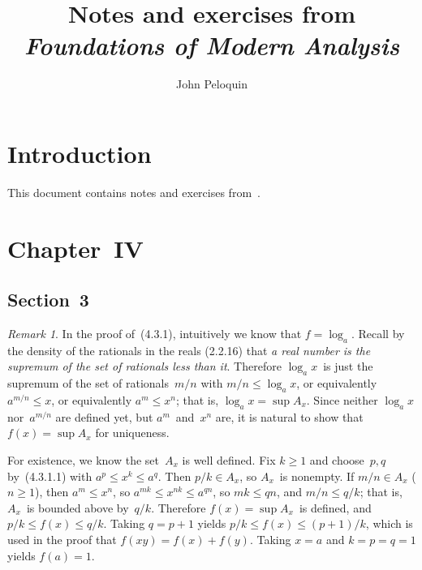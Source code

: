 \documentclass[letterpaper,12pt]{article}
\title{Notes and exercises from\\\textit{Foundations of Modern Analysis}}
\author{John Peloquin}
\date{}
\theoremstyle{plain}
\theoremstyle{definition}
\theoremstyle{remark}
\newtheorem*{rmk}{Remark}
\begin{document}
\maketitle

\section*{Introduction}
This document contains notes and exercises from~\cite{dieudonne}.

\section*{Chapter~IV}
\subsection*{Section~3}
\begin{rmk}
In the proof of~(4.3.1), intuitively we know that \(f=\log_a\). Recall by the density of the rationals in the reals (2.2.16) that \emph{a real number is the supremum of the set of rationals less than it}. Therefore \(\log_a x\)~is just the supremum of the set of rationals~\(m/n\) with \(m/n\le\log_a x\), or equivalently \(a^{m/n}\le x\), or equivalently \(a^m\le x^n\); that is, \(\log_a x=\sup A_x\). Since neither \(\log_a x\) nor~\(a^{m/n}\) are defined yet, but \(a^m\)~and~\(x^n\) are, it is natural to show that \(f(x)=\sup A_x\) for uniqueness.

For existence, we know the set~\(A_x\) is well defined. Fix \(k\ge 1\) and choose~\(p,q\) by~(4.3.1.1) with \(a^p\le x^k\le a^q\). Then \(p/k\in A_x\), so \(A_x\)~is nonempty. If \(m/n\in A_x\) (\(n\ge 1\)), then \(a^m\le x^n\), so \(a^{mk}\le x^{nk}\le a^{qn}\), so \(mk\le qn\), and \(m/n\le q/k\); that is, \(A_x\)~is bounded above by~\(q/k\). Therefore \(f(x)=\sup A_x\)~is defined, and \(p/k\le f(x)\le q/k\). Taking \(q=p+1\) yields \(p/k\le f(x)\le(p+1)/k\), which is used in the proof that \(f(xy)=f(x)+f(y)\). Taking \(x=a\) and \(k=p=q=1\) yields \(f(a)=1\).


\end{rmk}
\end{document}
